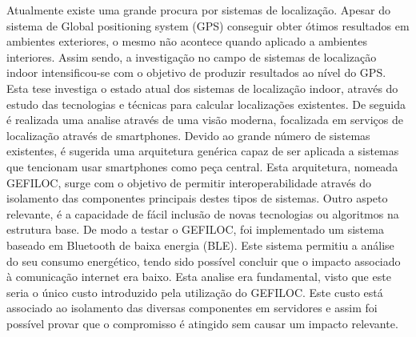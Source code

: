 \begin{resumo}

Atualmente existe uma grande procura por sistemas de localização. Apesar do sistema de Global positioning system (GPS) conseguir obter ótimos resultados em ambientes exteriores, o mesmo não acontece quando aplicado a ambientes interiores. Assim sendo, a investigação no campo de sistemas de localização indoor intensificou-se com o objetivo de produzir resultados ao nível do GPS. Esta tese investiga o estado atual dos sistemas de localização indoor, através do estudo das tecnologias e técnicas para calcular localizações existentes. De seguida é realizada uma analise através de uma visão moderna, focalizada em serviços de localização através de smartphones. Devido ao grande número de sistemas existentes, é sugerida uma arquitetura genérica capaz de ser aplicada a sistemas que tencionam usar smartphones como peça central. Esta arquitetura, nomeada GEFILOC, surge com o objetivo de permitir interoperabilidade através do isolamento das componentes principais destes tipos de sistemas. Outro aspeto relevante, é a capacidade de fácil inclusão de novas tecnologias ou algoritmos na estrutura base.  
De modo a testar o GEFILOC, foi implementado um sistema baseado em Bluetooth de baixa energia (BLE). Este sistema permitiu a análise do seu consumo energético, tendo sido possível concluir que o impacto associado à comunicação internet era baixo. Esta analise era fundamental, visto que este seria o único custo introduzido pela utilização do GEFILOC. Este custo está associado ao isolamento das diversas componentes em servidores e assim foi possível provar que o compromisso é atingido sem causar um impacto relevante.     

\end{resumo}